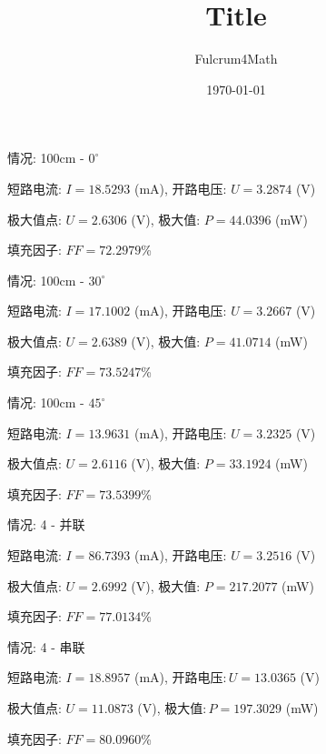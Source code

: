 \documentclass[UTF8]{ctexart}
\title{Title}
\author{Fulcrum4Math}
\date{\today}
\newcommand{\<}{\langle}
\renewcommand{\>}{\rangle}                              %
\theoremstyle{MyStyle} %
\begin{document}
\LARGE

\pagestyle{empty}

情况: 100cm - \({0}^\circ\)

短路电流: $I = 18.5293$ (mA), 开路电压: $U = 3.2874$ (V)

极大值点: $U = 2.6306$ (V), 极大值: $P = 44.0396$ (mW)

填充因子: $FF = 72.2979$\%

情况: 100cm - \({30}^\circ\)

短路电流: $I = 17.1002$ (mA), 开路电压: $U = 3.2667$ (V)

极大值点: $U = 2.6389$ (V), 极大值: $P = 41.0714$ (mW)

填充因子: $FF = 73.5247$\%

情况: 100cm - \({45}^\circ\)

短路电流: $I = 13.9631$ (mA), 开路电压: $U = 3.2325$ (V)

极大值点: $U = 2.6116$ (V), 极大值: $P = 33.1924$ (mW)

填充因子: $FF = 73.5399$\%

情况: 4 - 并联

短路电流: $I = 86.7393$ (mA), 开路电压: $U = 3.2516$ (V)

极大值点: $U = 2.6992$ (V), 极大值: $P = 217.2077$ (mW)

填充因子: $FF = 77.0134$\%

情况: 4 - 串联

短路电流: $I = 18.8957$ (mA), $开路电压: U = 13.0365$ (V)

极大值点: $U = 11.0873$ (V), $极大值: P = 197.3029$ (mW)

填充因子: $FF = 80.0960$\%
    
\end{document}
